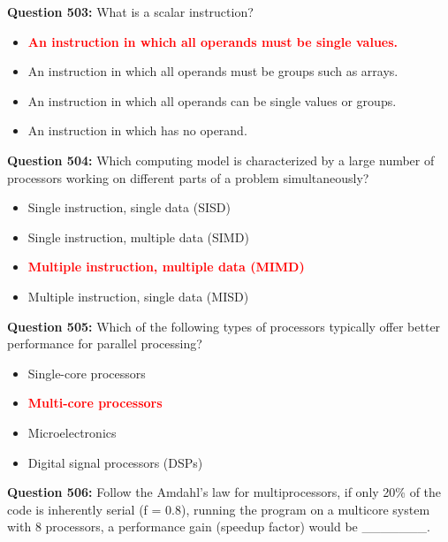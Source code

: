 \documentclass[12pt,a4paper]{article}
\begin{document}
\textbf{Question 503:} What is a scalar instruction?

\begin{itemize}
    \item[\textbf{A.}] \textcolor{red}{\textbf{An instruction in which all operands must be single values.}}
    \item[\textbf{B.}] An instruction in which all operands must be groups such as arrays.
    \item[\textbf{C.}] An instruction in which all operands can be single values or groups.
    \item[\textbf{D.}] An instruction in which has no operand.
\end{itemize}

\vspace{0.5cm}

\textbf{Question 504:} Which computing model is characterized by a large number of processors working on different parts of a problem simultaneously?

\begin{itemize}
    \item[\textbf{A.}] Single instruction, single data (SISD)
    \item[\textbf{B.}] Single instruction, multiple data (SIMD)
    \item[\textbf{C.}] \textcolor{red}{\textbf{Multiple instruction, multiple data (MIMD)}}
    \item[\textbf{D.}] Multiple instruction, single data (MISD)
\end{itemize}

\vspace{0.5cm}

\textbf{Question 505:} Which of the following types of processors typically offer better performance for parallel processing?

\begin{itemize}
    \item[\textbf{A.}] Single-core processors
    \item[\textbf{B.}] \textcolor{red}{\textbf{Multi-core processors}}
    \item[\textbf{C.}] Microelectronics
    \item[\textbf{D.}] Digital signal processors (DSPs)
\end{itemize}

\vspace{0.5cm}

\textbf{Question 506:} Follow the Amdahl's law for multiprocessors, if only 20\% of the code is inherently serial (f = 0.8), running the program on a multicore system with 8 processors, a performance gain (speedup factor) would be _______.
\end{document}
